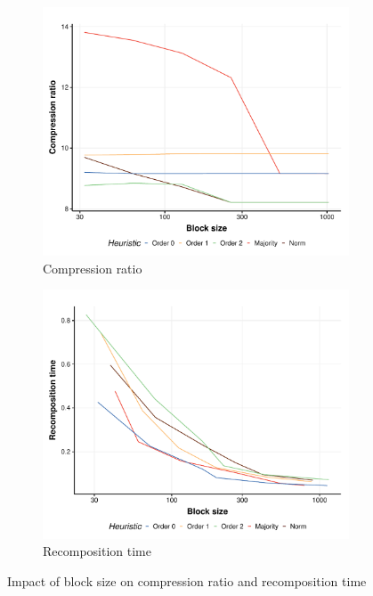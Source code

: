 \documentclass[conference]{IEEEtran}
\theoremstyle{remark}
\begin{document}
\begin{figure}
\begin{subfigure}[b]{0.45\linewidth}
    \centering
    \includegraphics[width=\linewidth]{Img/blocksize_vs_size.pdf}
    \caption{Compression ratio}
    \label{fig:blocksizeCR}
\end{subfigure}
\begin{subfigure}[b]{0.45\linewidth}
    \centering
    \includegraphics[width=\linewidth]{Img/time_recompose.pdf}
    \caption{Recomposition time}
    \label{fig:blocksizetime}
\end{subfigure}
\caption{Impact of block size on compression ratio and recomposition time}
\label{fig:blocksize}
\end{figure}
\end{document}
